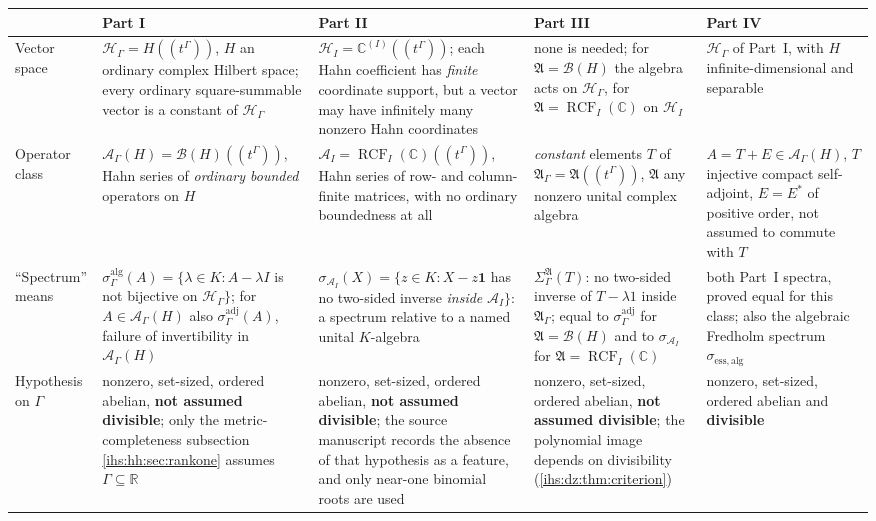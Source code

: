 \documentclass[11pt,a4paper]{article}
\numberwithin{equation}{section}
\theoremstyle{definition}
\theoremstyle{remark}
\newcommand{\C}{\mathbb C}
\newcommand{\R}{\mathbb R}
\newcommand{\K}{K}
\newcommand{\Hil}{\mathcal H_\Gamma}
\newcommand{\Hrf}{\mathcal H_I}
\newcommand{\B}{\mathcal B(H)}
\newcommand{\Ahh}{\mathcal A_\Gamma(H)}
\newcommand{\Arf}{\mathcal A_I}
\newcommand{\RCF}{\operatorname{RCF}}
\newcommand{\Id}{\mathbf 1}
\newcommand{\Alg}{\mathfrak A}
\newcommand{\AlgG}{\mathfrak A_\Gamma}
\newcommand{\SigA}{\Sigma^{\Alg}_\Gamma}
\begin{document}
\begin{table}[p]
\centering\footnotesize
\setlength{\tabcolsep}{3.5pt}
\begin{tabularx}{\textwidth}{@{}>{\raggedright\arraybackslash}p{}YYYY@{}}
\toprule
 & Part I & Part II & Part III & Part IV\\
\midrule
Vector space &
$\Hil=H((t^\Gamma))$, $H$ an ordinary complex Hilbert space; every ordinary
square-summable vector is a constant of $\Hil$ &
$\Hrf=\C^{(I)}((t^\Gamma))$; each Hahn coefficient has \emph{finite}
coordinate support, but a vector may have infinitely many nonzero Hahn
coordinates &
none is needed; for $\Alg=\B$ the algebra acts on $\Hil$, for
$\Alg=\RCF_I(\C)$ on $\Hrf$ &
$\Hil$ of Part~I, with $H$ infinite-dimensional and separable\\
\addlinespace
Operator class &
$\Ahh=\B((t^\Gamma))$, Hahn series of \emph{ordinary bounded} operators on
$H$ &
$\Arf=\RCF_I(\C)((t^\Gamma))$, Hahn series of row- and column-finite
matrices, with no ordinary boundedness at all &
\emph{constant} elements $T$ of $\AlgG=\Alg((t^\Gamma))$, $\Alg$ any nonzero
unital complex algebra &
$A=T+E\in\Ahh$, $T$ injective compact self-adjoint, $E=E^*$ of positive
order, not assumed to commute with $T$\\
\addlinespace
``Spectrum'' means &
$\sigma^{\mathrm{alg}}_\Gamma(A)=\{\lambda\in\K:A-\lambda I$ is not
bijective on $\Hil\}$; for $A\in\Ahh$ also
$\sigma^{\mathrm{adj}}_\Gamma(A)$, failure of invertibility in $\Ahh$ &
$\sigma_{\Arf}(X)=\{z\in\K:X-z\Id$ has no two-sided inverse
\emph{inside} $\Arf\}$: a spectrum relative to a named unital
$\K$-algebra &
$\SigA(T)$: no two-sided inverse of $T-\lambda1$ inside $\AlgG$; equal to
$\sigma^{\mathrm{adj}}_\Gamma$ for $\Alg=\B$ and to $\sigma_{\Arf}$ for
$\Alg=\RCF_I(\C)$ &
both Part~I spectra, proved equal for this class; also the algebraic
Fredholm spectrum $\sigma_{\mathrm{ess,alg}}$\\
\addlinespace
Hypothesis on $\Gamma$ &
nonzero, set-sized, ordered abelian, \textbf{not assumed divisible};
only the metric-completeness subsection
\ref{ihs:hh:sec:rankone} assumes $\Gamma\subseteq\R$ &
nonzero, set-sized, ordered abelian, \textbf{not assumed divisible}; the
source manuscript records the absence of that hypothesis as a feature, and
only near-one binomial roots are used &
nonzero, set-sized, ordered abelian, \textbf{not assumed divisible}; the
polynomial image depends on divisibility (\cref{ihs:dz:thm:criterion}) &
nonzero, set-sized, ordered abelian and \textbf{divisible}\\

\end{tabularx}
\end{table}
\end{document}
